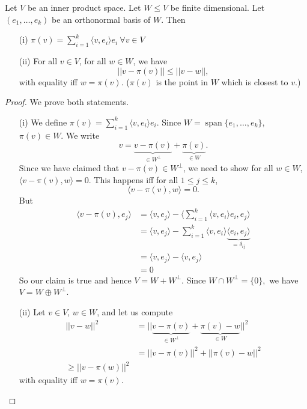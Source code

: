 \documentclass[a4paper]{scrartcl}
\begin{document}
\begin{lemma}
      Let $V$ be an inner product space. Let $W \leq V$ be finite dimensional. Let $(e_1, \ldots ,e_k)$ be an orthonormal basis of $W$. Then 
      \begin{itemize}
           \item[(i)] $\pi (v)=\sum_{i=1}^{k}\langle v,e_i\rangle  e_i  \ \forall v \in V $
           \item[(ii)] For all $v \in V$, for all $w \in W$, we have 
           \[||v-\pi (v)||\leq ||v-w||,\]
           with equality iff $w=\pi (v)$. ($\pi (v)$ is the point in $W$ which is closest to $v$.)
      \end{itemize}
\end{lemma}
\begin{proof}
     We prove both statements.
      \begin{itemize}
           \item[(i)]We define $\pi (v)= \sum_{i=1}^{k}\langle v,e_i \rangle e_i$. Since $W=\operatorname{span}\{e_1,\ldots ,e_k\}$, $\pi (v) \in W$. We write 
           \[v=\underbrace{v-\pi (v)}_{\in W^\perp}+\underbrace{\pi (v)}_{\in W}.\]
           Since we have claimed that $v-\pi (v) \in W^\perp$, we need to show for all $w \in W$, $\langle v-\pi (v), w \rangle =0$. This happens iff for all $1 \leq j \leq k$, 
           \[\langle v-\pi (v),w \rangle=0 .\]
           But 
           \begin{align*}
                \langle v-\pi (v), e_j \rangle &=\langle v,e_j \rangle -\langle \sum_{i=1}^{k}\langle v,e_i \rangle e_i,e_j \rangle\\&=\langle v,e_j \rangle - \sum_{i=1}^{k}\langle v,e_i \rangle \underbrace{\langle e_i,e_j \rangle }_{=\delta_{ij}}\\&=\langle v,e_j \rangle -\langle v,e_j \rangle \\&=0
           \end{align*}
           So our claim is true and hence $V=W +W^\perp$. Since $W \cap W^\perp=\{0\},$ we have $V=W \oplus W^\perp$.
           \item[(ii)] Let $v \in V$, $w \in W$, and let us compute 
           \begin{align*}
                ||v-w||^2&=||\underbrace{v-\pi (v)}_{\in W^\perp}+\underbrace{\pi (v)-w}_{\in W}||^2\\
                &=||v-\pi (v)||^2+ ||\pi (v)-w||^2\\
                \geq ||v-\pi (w)||^2
           \end{align*}
          with equality iff $w=\pi (v)$.
      \end{itemize}
\end{proof}
\end{document}
